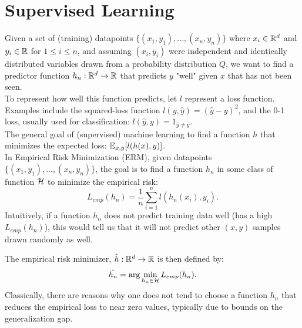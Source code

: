 \documentclass[twoside]{memoir}
\begin{document}
\section{Supervised Learning}
Given a set of (training) datapoints $\{(x_1,y_1), ..., (x_n,y_n)\}$ where $x_i \in \mathbb{R}^d$ and $y_i \in \mathbb{R}$ for $1 \leq i \leq n$, and assuming $(x_i, y_i)$ were independent and identically distributed variables drawn from a probability distribution $Q$, we want to find a predictor function $h_n:\mathbb{R}^d \rightarrow \mathbb{R}$ that predicts $y$ "well" given $x$ that has not been seen.\\
To represent how well this function predicts, let $l$ represent a loss function. Examples include the squared-loss function $l(y,\hat{y}) = (\hat{y} - y)^2$, and the 0-1 loss, usually used for classification: $l(\hat{y},y) = 1_{\hat{y} \neq y}$.\\
The general goal of (supervised) machine learning to find a function $h$ that minimizes the expected loss: $\mathbb{E}_{x,y}[l(h(x), y)]$.\\
In Empirical Risk Minimization (ERM), given datapoints $\{(x_1,y_1), ..., (x_n,y_n)\}$, the goal is to find a function $h_n$ in some class of function $\mathcal{H}$  to minimize the empirical risk: 
\[L_{emp}(h_n) = \frac{1}{n} \sum_{i=1}^{n} l(h_n(x_i), y_i). \]
Intuitively, if a function $h_n$ does not predict training data well (has a high $L_{emp}(h_n)$), this would tell us that it will not predict other $(x,y)$ samples drawn randomly as well. 

The empirical risk minimizer, $\hat{h}: \mathbb{R}^d \rightarrow \mathbb{R}$ is then defined by:
\[ \hat{h_n} = \arg\min_{h_n \in \mathcal{H}} L_{emp}(h_n). \]
Classically, there are reasons why one does not tend to choose a function $h_n$ that reduces the empirical loss to near zero values, typically due to bounds on the generalization gap.
\end{document}
